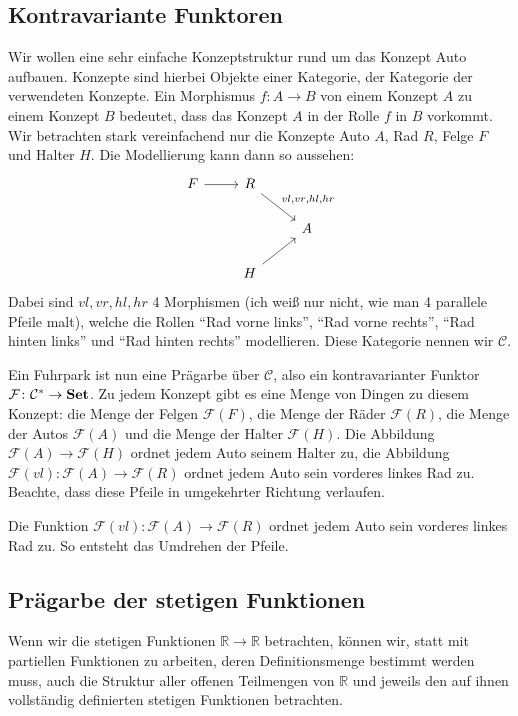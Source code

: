 \documentclass[a4paper]{amsart}
\theoremstyle{definition}
\newcommand{\R}{\ensuremath{\mathbb{ R }}}
\newcommand{\CC}{\ensuremath{\mathcal{ C }}}
\newcommand{\FF}{\ensuremath{\mathcal{ F }}}
\newcommand{\Set}{\text{\textbf{Set}}}
\begin{document}
\subsection{Kontravariante Funktoren}
Wir wollen eine sehr einfache Konzeptstruktur rund um das Konzept Auto aufbauen. Konzepte sind hierbei Objekte einer Kategorie, der Kategorie der verwendeten Konzepte. Ein Morphismus $f \colon A \to B$ von einem Konzept $A$ zu einem Konzept $B$ bedeutet, dass das Konzept $A$ in der Rolle $f$ in $B$ vorkommt. Wir betrachten stark vereinfachend nur die Konzepte Auto $A$, Rad $R$, Felge $F$ und Halter $H$. Die Modellierung kann dann so aussehen:  
\begin{equation}
   \begin{tikzcd}
      F \arrow[r] & R \arrow[dr,"vl{,}vr{,}hl{,}hr"] \\
      && A\\
      & H \arrow[ur]
   \end{tikzcd}
\end{equation}
Dabei sind $vl{,}vr{,}hl{,}hr$ 4 Morphismen (ich weiß nur nicht, wie man 4 parallele Pfeile malt), welche die Rollen "`Rad vorne links"', "`Rad vorne rechts"', "`Rad hinten links"' und "`Rad hinten rechts"' modellieren. Diese Kategorie nennen wir $\CC$.

Ein Fuhrpark ist nun eine Prägarbe über $\CC$, also ein kontravarianter Funktor $\FF \colon \CC^* \to \Set$. Zu jedem Konzept gibt es eine Menge von Dingen zu diesem Konzept: die Menge der Felgen $\FF(F)$, die Menge der Räder $\FF(R)$, die Menge der Autos $\FF(A)$ und die Menge der Halter $\FF(H)$.
Die Abbildung $\FF(A) \to \FF(H)$ ordnet jedem Auto seinem Halter zu, die Abbildung $\FF(vl) \colon \FF(A) \to \FF(R)$ ordnet jedem Auto sein vorderes linkes Rad zu. Beachte, dass diese Pfeile in umgekehrter Richtung verlaufen.

Die Funktion $\FF(vl) \colon \FF(A) \to \FF(R)$ ordnet jedem Auto sein vorderes linkes Rad zu. So entsteht das Umdrehen der Pfeile.

\subsection{Prägarbe der stetigen Funktionen}
Wenn wir die stetigen Funktionen $\R \to \R$ betrachten, können wir,
statt mit partiellen Funktionen zu arbeiten, deren Definitionsmenge bestimmt werden muss, auch die Struktur aller offenen Teilmengen von $\R$ und jeweils den auf ihnen vollständig definierten stetigen Funktionen betrachten.
\end{document}
